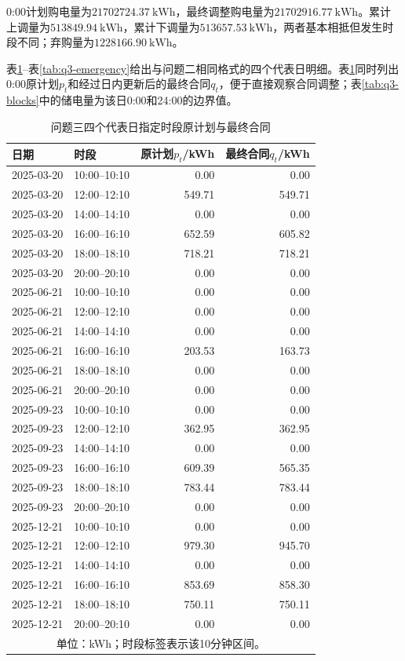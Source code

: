 \documentclass[UTF8,12pt,a4paper]{ctexart}
\theoremstyle{remark}
\begin{document}
0:00计划购电量为$21702724.37\ \mathrm{kWh}$，最终调整购电量为$21702916.77\ \mathrm{kWh}$。累计上调量为$513849.94\ \mathrm{kWh}$，累计下调量为$513657.53\ \mathrm{kWh}$，两者基本相抵但发生时段不同；弃购量为$1228166.90\ \mathrm{kWh}$。

表\ref{tab:q3-selected}--表\ref{tab:q3-emergency}给出与问题二相同格式的四个代表日明细。表\ref{tab:q3-selected}同时列出0:00原计划$p_t$和经过日内更新后的最终合同$q_t$，便于直接观察合同调整；表\ref{tab:q3-blocks}中的储电量为该日0:00和24:00的边界值。
\begin{table}[htbp]\centering\scriptsize
\caption{问题三四个代表日指定时段原计划与最终合同}\label{tab:q3-selected}
\begin{tabular}{llrr}\toprule 日期&时段&原计划$p_t$/kWh&最终合同$q_t$/kWh\\\midrule
2025-03-20&10:00--10:10&0.00&0.00\\
2025-03-20&12:00--12:10&549.71&549.71\\
2025-03-20&14:00--14:10&0.00&0.00\\
2025-03-20&16:00--16:10&652.59&605.82\\
2025-03-20&18:00--18:10&718.21&718.21\\
2025-03-20&20:00--20:10&0.00&0.00\\
2025-06-21&10:00--10:10&0.00&0.00\\
2025-06-21&12:00--12:10&0.00&0.00\\
2025-06-21&14:00--14:10&0.00&0.00\\
2025-06-21&16:00--16:10&203.53&163.73\\
2025-06-21&18:00--18:10&0.00&0.00\\
2025-06-21&20:00--20:10&0.00&0.00\\
2025-09-23&10:00--10:10&0.00&0.00\\
2025-09-23&12:00--12:10&362.95&362.95\\
2025-09-23&14:00--14:10&0.00&0.00\\
2025-09-23&16:00--16:10&609.39&565.35\\
2025-09-23&18:00--18:10&783.44&783.44\\
2025-09-23&20:00--20:10&0.00&0.00\\
2025-12-21&10:00--10:10&0.00&0.00\\
2025-12-21&12:00--12:10&979.30&945.70\\
2025-12-21&14:00--14:10&0.00&0.00\\
2025-12-21&16:00--16:10&853.69&858.30\\
2025-12-21&18:00--18:10&750.11&750.11\\
2025-12-21&20:00--20:10&0.00&0.00\\\bottomrule
\multicolumn{4}{c}{单位：kWh；时段标签表示该10分钟区间。}\end{tabular}\end{table}
\end{document}
